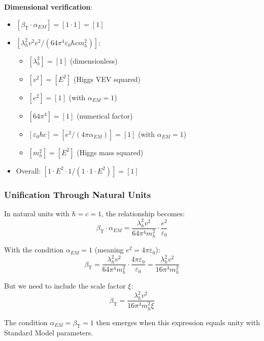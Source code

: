 \documentclass[12pt,a4paper]{article}
\newcommand{\betaT}{\beta_{\text{T}}}
\begin{document}
	\textbf{Dimensional verification}:
	\begin{itemize}
		\item $[\betaT \cdot \alpha_{EM}] = [1 \cdot 1] = [1]$
		\item $[\lambda_h^2 v^2 e^2/(64\pi^4\varepsilon_0\hbar c m_h^2)]$:
		\begin{itemize}
			\item $[\lambda_h^2] = [1]$ (dimensionless)
			\item $[v^2] = [E^2]$ (Higgs VEV squared)
			\item $[e^2] = [1]$ (with $\alpha_{EM} = 1$)
			\item $[64\pi^4] = [1]$ (numerical factor)
			\item $[\varepsilon_0\hbar c] = [e^2/(4\pi\alpha_{EM})] = [1]$ (with $\alpha_{EM} = 1$)
			\item $[m_h^2] = [E^2]$ (Higgs mass squared)
		\end{itemize}
		\item Overall: $[1 \cdot E^2 \cdot 1 / (1 \cdot 1 \cdot E^2)] = [1]$ \checkmark
	\end{itemize}
	
	\subsubsection{Unification Through Natural Units}
	\label{subsubsec:natural_units_unification}
	
	In natural units with $\hbar = c = 1$, the relationship becomes:
	\begin{equation}
		\betaT \cdot \alpha_{EM} = \frac{\lambda_h^2 v^2}{64\pi^4 m_h^2} \cdot \frac{e^2}{\varepsilon_0}
	\end{equation}
	
	With the condition $\alpha_{EM} = 1$ (meaning $e^2 = 4\pi\varepsilon_0$):
	\begin{equation}
		\betaT = \frac{\lambda_h^2 v^2}{64\pi^4 m_h^2} \cdot \frac{4\pi\varepsilon_0}{\varepsilon_0} = \frac{\lambda_h^2 v^2}{16\pi^3 m_h^2}
	\end{equation}
	
	But we need to include the scale factor $\xi$:
	\begin{equation}
		\boxed{\betaT = \frac{\lambda_h^2 v^2}{16\pi^3 m_h^2 \xi}}
	\end{equation}
	
	The condition $\alpha_{EM} = \betaT = 1$ then emerges when this expression equals unity with Standard Model parameters.
	
\end{document}
